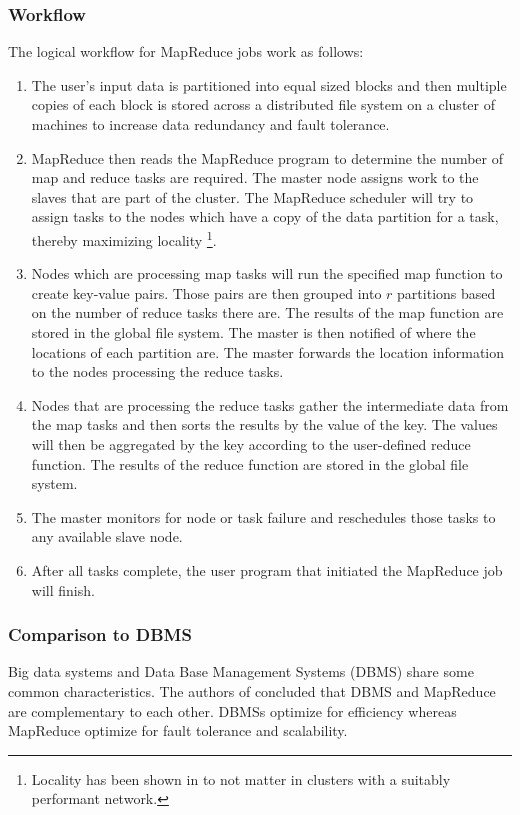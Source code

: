 \documentclass[12pt]{article}
\begin{document}
\subsubsection{Workflow}

The logical workflow for MapReduce jobs work as follows:
\begin{enumerate}
    \item The user's input data is partitioned into equal sized blocks and then multiple copies of each block is stored across a distributed file system on a cluster of machines to increase data redundancy and fault tolerance.
    \item MapReduce then reads the MapReduce program to determine the number of map and reduce tasks are required. The master node assigns work to the slaves that are part of the cluster. The MapReduce scheduler will try to assign tasks to the nodes which have a copy of the data partition for a task, thereby maximizing locality \footnote{Locality has been shown in \cite{ousterhout2015making} to not matter in clusters with a suitably performant network.}.
    \item Nodes which are processing map tasks will run the specified map function to create key-value pairs. Those pairs are then grouped into $r$ partitions based on the number of reduce tasks there are. The results of the map function are stored in the global file system. The master is then notified of where the locations of each partition are. The master forwards the location information to the nodes processing the reduce tasks.
    \item Nodes that are processing the reduce tasks gather the intermediate data from the map tasks and then sorts the results by the value of the key. The values will then be aggregated by the key according to the user-defined reduce function. The results of the reduce function are stored in the global file system.
    \item The master monitors for node or task failure and reschedules those tasks to any available slave node.
    \item After all tasks complete, the user program that initiated the MapReduce job will finish.
\end{enumerate}


\subsubsection{Comparison to DBMS}

Big data systems and Data Base Management Systems (DBMS) share some common characteristics. The authors of \cite{stonebreaker2010mapreduce} concluded that DBMS and MapReduce are complementary to each other. DBMSs optimize for efficiency whereas MapReduce optimize for fault tolerance and scalability.
\end{document}
